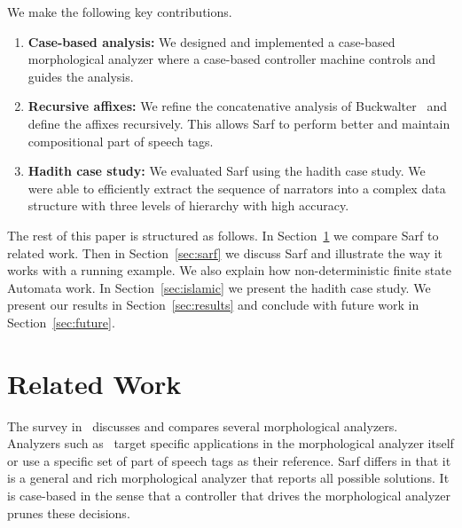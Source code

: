 \documentclass[11pt]{article}
\begin{document}
We make the following key contributions. 
\begin{enumerate}
\item {\bf Case-based analysis:}  We designed and implemented
a case-based morphological analyzer where a case-based controller
machine controls and guides the analysis. 
\item {\bf Recursive affixes:}
We refine the concatenative analysis of 
Buckwalter~  and define the affixes
recursively. 
This allows Sarf to perform better and 
maintain compositional part of speech tags.
\item {\bf Hadith case study:}
We evaluated Sarf using the hadith case study. We were able to
efficiently extract the sequence of narrators into a complex
data structure with three levels of hierarchy with high accuracy. 
\end{enumerate}


The rest of this paper is structured as follows. In Section~\ref{sec:related}
we compare Sarf to related work. Then in Section~\ref{sec:sarf}
we discuss Sarf and illustrate the way it works with a running 
example.
We also explain how non-deterministic finite state Automata
work. In Section~\ref{sec:islamic} we present the hadith case
study. We present our results in Section~\ref{sec:results}
and conclude with future work in Section~\ref{sec:future}.


\section{Related Work }
\label{sec:related}

The survey in~\cite{Sughaiyer:04} discusses and compares
several morphological analyzers. 
Analyzers such as~\cite{Khoja:01,Darwish:02} 
target specific applications in the morphological 
analyzer itself or use a specific set of part of speech tags
as their reference.
Sarf differs in that it is a general and rich morphological 
analyzer that reports all possible solutions. 
It is case-based in the sense that a controller that drives
the morphological analyzer prunes these decisions. 
\end{document}
